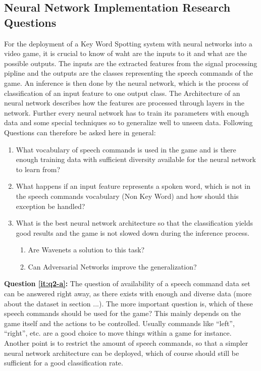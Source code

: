 \subsection{Neural Network Implementation Research Questions}\label{sec:intro_rq}
For the deployment of a Key Word Spotting system with neural networks into a video game, it is crucial to know of waht are the inputs to it and what are the possible outputs. 
The inputs are the extracted features from the signal processing pipline and the outputs are the classes representing the speech commands of the game. 
An inference is then done by the neural network, which is the process of classification of an input feature to one output class.
The Architecture of an neural network describes how the features are processed through layers in the network.
Further every neural network has to train its parameters with enough data and some special techniques so to generalize well to unseen data.
Following Questions can therefore be asked here in general:

\begin{enumerate}[label={Q.2.\alph*)}, leftmargin=1.75cm]
    \item What vocabulary of speech commands is used in the game and is there enough training data with sufficient diversity available for the neural network to learn from?
    \label{it:q2-a}
    
    \item What happens if an input feature represents a spoken word, which is not in the speech commands vocabulary (Non Key Word) and how should this exception be handled?
    \label{it:q2-b}
    
    \item What is the best neural network architecture so that the classification yields good results and the game is not slowed down during the inference process.
    \label{it:q2-c}
    \begin{enumerate}[label=(\roman*)]
        \item Are Wavenets a solution to this task? 
        \item Can Adversarial Networks improve the generalization?
    \end{enumerate}
    
\end{enumerate}
\noindent
\textbf{Question \ref{it:q2-a}:} The question of availability of a speech command data set can be answered right away, as there exists with enough and diverse data (more about the dataset in section ...). The more important question is, which of these speech commands should be used for the game? This mainly depends on the game itself and the actions to be controlled. Usually commands like \enquote{left}, \enquote{right}, etc. are a good choice to move things within a game for instance.
Another point is to restrict the amount of speech commands, so that a simpler neural network architecture can be deployed, which of course should still be sufficient for a good classification rate.

